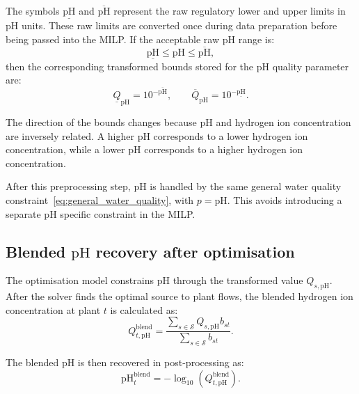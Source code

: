 \documentclass[10pt]{article}
\begin{document}
The symbols $\underline{\mathrm{pH}}$ and $\overline{\mathrm{pH}}$ represent the
raw regulatory lower and upper limits in $\mathrm{pH}$ units. These raw limits
are converted once during data preparation before being passed into the MILP.
If the acceptable raw $\mathrm{pH}$ range is:
\begin{equation}\label{eq:raw_ph_range}
    \underline{\mathrm{pH}}
    \leq
    \mathrm{pH}
    \leq
    \overline{\mathrm{pH}},
\end{equation}
then the corresponding transformed bounds stored for the $\mathrm{pH}$ quality
parameter are:
\begin{equation}\label{eq:ph_bound_transformation}
    \underline{Q}_{\mathrm{pH}} = 10^{-\overline{\mathrm{pH}}},
    \qquad
    \overline{Q}_{\mathrm{pH}} = 10^{-\underline{\mathrm{pH}}}.
\end{equation}

The direction of the bounds changes because $\mathrm{pH}$ and hydrogen ion
concentration are inversely related. A higher $\mathrm{pH}$ corresponds to a
lower hydrogen ion concentration, while a lower $\mathrm{pH}$ corresponds to a
higher hydrogen ion concentration.

After this preprocessing step, $\mathrm{pH}$ is handled by the same general
water quality constraint~\eqref{eq:general_water_quality}, with
$p=\mathrm{pH}$. This avoids introducing a separate $\mathrm{pH}$ specific
constraint in the MILP.

\subsection{Blended $\mathrm{pH}$ recovery after optimisation}

The optimisation model constrains $\mathrm{pH}$ through the transformed value
$Q_{s,\mathrm{pH}}$. After the solver finds the optimal source to plant flows,
the blended hydrogen ion concentration at plant $t$ is calculated as:
\begin{equation}\label{eq:blended_ph_transformed}
    Q^{\mathrm{blend}}_{t,\mathrm{pH}}
    =
    \frac{
        \sum_{s \in \mathcal{S}} Q_{s,\mathrm{pH}} b_{st}
    }{
        \sum_{s \in \mathcal{S}} b_{st}
    }.
\end{equation}

The blended $\mathrm{pH}$ is then recovered in post-processing as:
\begin{equation}\label{eq:blended_ph_recovery}
    \mathrm{pH}^{\mathrm{blend}}_{t}
    =
    -\log_{10}
    \left(
    Q^{\mathrm{blend}}_{t,\mathrm{pH}}
    \right).
\end{equation}
\end{document}
